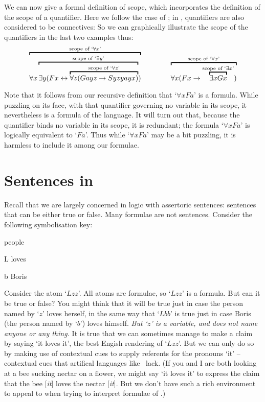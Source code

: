We can now give a formal definition of scope, which incorporates the definition of the scope of a quantifier. Here we follow the case of \TFL; in \FOL, quantifiers are also considered to be connectives:
So we can graphically illustrate the scope of the quantifiers in the last two examples thus:
	$$\overbracket{\forall x \overbracket{\exists y (Fx \eiff \overbracket{\forall z (Gayz \eif Syzyayx)}^{\text{scope of `}\forall z\text{'}}}^{\text{scope of `}\exists y\text{'}})}^{\text{scope of `}\forall x\text{'}} \qquad\qquad 
\overbracket{\forall x (Fx \eif \overbracket{\exists x Gx}^{\text{scope of `$\exists x$'}})}^{\text{scope of `$\forall x$'}}	$$

Note that it follows from our recursive definition that `$\forall x Fa$' is a formula. While puzzling on its face, with that quantifier governing no variable in its scope, it nevertheless is a formula of the language. It will turn out that, because the quantifier binds no variable in its scope, it is redundant; the formula `$\forall xFa$' is logically equivalent to `$Fa$'. Thus while `$\forall x Fa$' may be a bit puzzling, it is harmless to include it among our formulae. 

\section{Sentences in \FOL} \label{s:fol}
Recall that we are largely concerned in logic with assertoric sentences: sentences that can be either true or false. Many formulae are not sentences. Consider the following symbolisation key:
	\begin{ekey}
		\item[\domain] people
		\item[L]  loves 
		\item[b] Boris
	\end{ekey}
Consider the atom `$Lzz$'. All atoms are formulae, so `$Lzz$' is a formula. But can it be true or false? You might think that it will be true just in case the person named by `$z$' loves herself, in the same way that `$Lbb$' is true just in case Boris (the person named by `$b$') loves himself. \emph{But `$z$' is a variable, and does not name anyone or any thing.} It is true that we can sometimes manage to make a claim by saying `it loves it', the best Engish rendering of `$Lzz$'. But we can only do so by making use of contextual cues to supply referents for the pronouns `it' – contextual cues that artifical languages like \FOL\ lack. (If you and I are both looking at a bee sucking nectar on a flower, we might say `it loves it' to express the claim that the bee [\emph{it}]  loves the nectar [\emph{it}]. But we don't have such a rich environment to appeal to when trying to interpret formulae of \FOL.)

